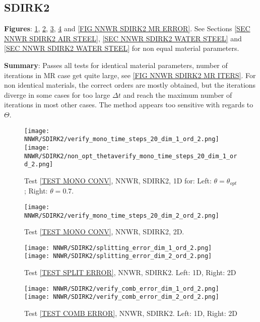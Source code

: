 \documentclass[a4paper,10pt]{article}
\begin{document}
\FloatBarrier
\subsection{SDIRK2}\label{SEC NNWR SDIRK2}
% 
\textbf{Figures}: \ref{FIG NNWR SDIRK2 1D MONO CONV}, \ref{FIG NNWR SDIRK2 2D MONO CONV}, \ref{FIG NNWR SDIRK2 SPLIT ERROR}, \ref{FIG NNWR SDIRK2 COMB ERROR} and \ref{FIG NNWR SDIRK2 MR ERROR}. See Sections \ref{SEC NNWR SDIRK2 AIR STEEL}, \ref{SEC NNWR SDIRK2 WATER STEEL} and \ref{SEC NNWR SDIRK2 WATER STEEL} for non equal material parameters.

\textbf{Summary}: Passes all tests for identical material parameters, number of iterations in MR case get quite large, see \ref{FIG NNWR SDIRK2 MR ITERS}. For non identical materials, the correct orders are mostly obtained, but the iterations diverge in some cases for too large $\Delta t$ and reach the maximum number of iterations in most other cases. The method appears too sensitive with regards to $\Theta$.

\begin{figure}[!ht]
\texttt{[image: NNWR/SDIRK2/verify\_mono\_time\_steps\_20\_dim\_1\_ord\_2.png]}
\texttt{[image: NNWR/SDIRK2/non\_opt\_thetaverify\_mono\_time\_steps\_20\_dim\_1\_ord\_2.png]}
\caption{Test \ref{TEST MONO CONV}, NNWR, SDIRK2, 1D for: Left: $\theta = \theta_{opt}$; Right: $\theta = 0.7$.}
\label{FIG NNWR SDIRK2 1D MONO CONV}
\end{figure}

\begin{figure}[!ht]
\texttt{[image: NNWR/SDIRK2/verify\_mono\_time\_steps\_20\_dim\_2\_ord\_2.png]}
\caption{Test \ref{TEST MONO CONV}, NNWR, SDIRK2, 2D.}
\label{FIG NNWR SDIRK2 2D MONO CONV}
\end{figure}

\begin{figure}[!ht]
\texttt{[image: NNWR/SDIRK2/splitting\_error\_dim\_1\_ord\_2.png]}
\texttt{[image: NNWR/SDIRK2/splitting\_error\_dim\_2\_ord\_2.png]}
\caption{Test \ref{TEST SPLIT ERROR}, NNWR, SDIRK2. Left: 1D, Right: 2D}
\label{FIG NNWR SDIRK2 SPLIT ERROR}
\end{figure}

\begin{figure}[!ht]
\texttt{[image: NNWR/SDIRK2/verify\_comb\_error\_dim\_1\_ord\_2.png]}
\texttt{[image: NNWR/SDIRK2/verify\_comb\_error\_dim\_2\_ord\_2.png]}
\caption{Test \ref{TEST COMB ERROR}, NNWR, SDIRK2. Left: 1D, Right: 2D}
\label{FIG NNWR SDIRK2 COMB ERROR}
\end{figure}
\end{document}
